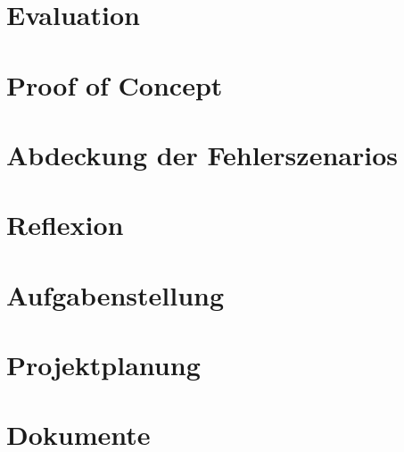 \documentclass[
11pt, %
a4paper, %
BCOR10mm, %
DIV14, %
footsepline = false, %
headsepline, %
oneside, %
openright,
parskip=half, %
abstracton, %
listof=totocnumbered, %
bibliography=totocnumbered %
]{scrreprt}
\begin{document}
  \chapter{Evaluation}
  \label{cha:evaluation}
  

  \chapter{Proof of Concept}
  \label{cha:proof_of_concept}
  
  
  \chapter{Abdeckung der Fehlerszenarios}
  \label{cha:abdeckung_der_fehlerszenarios}
  
    
  \chapter{Reflexion}
  \label{cha:reflexion}
  
  
  \appendix
  
  \chapter{Aufgabenstellung}
  \label{cha:aufgabenstellung}
  
  
  \chapter{Projektplanung}
  \label{cha:projektplanung}
  
  
  \chapter{Dokumente}
  \label{cha:dokumente}
  
   
  \listoffigures
  \listoftables
  
  \printglossaries
  
  \nocite{*}
  
  
\end{document}
